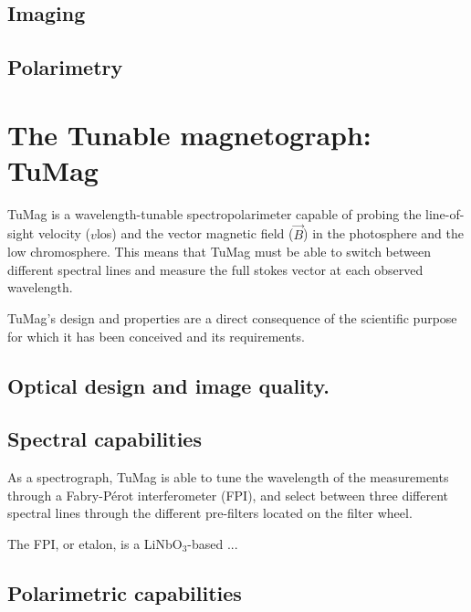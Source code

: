 \documentclass[12pt]{mythesis}
\begin{document}
\subsection{Imaging}

\subsection{Polarimetry}










\section{The Tunable magnetograph: TuMag}

TuMag is a wavelength-tunable spectropolarimeter capable of probing the line-of-sight velocity ($v$los) and the vector magnetic field ($\vec{B}$) in the photosphere and the low chromosphere. This means that TuMag must be able to switch between different spectral lines and measure the full stokes vector at each observed wavelength. 

TuMag's design and properties are a direct consequence of the scientific purpose for which it has been conceived and its requirements. 

\subsection{Optical design and image quality.}



\subsection{Spectral capabilities}

As a spectrograph, TuMag is able to tune the wavelength of the measurements through a Fabry-Pérot interferometer (FPI), and select between three different spectral lines through the different pre-filters located on the filter wheel. 

The FPI, or etalon, is a LiNbO$_3$-based ...



\subsection{Polarimetric capabilities}
\end{document}
